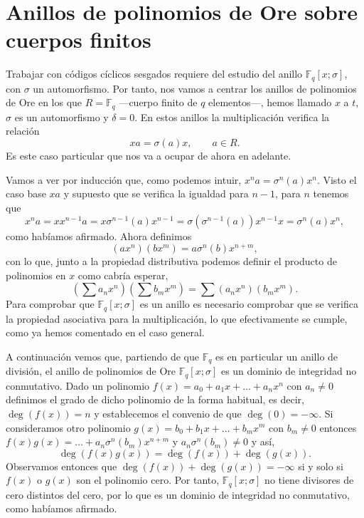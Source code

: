 \section{Anillos de polinomios de Ore sobre cuerpos finitos}

Trabajar con códigos cíclicos sesgados requiere del estudio del anillo \(\mathbb F_q[x; \sigma]\), con \(\sigma\) un automorfismo.
Por tanto, nos vamos a centrar los anillos de polinomios de Ore en los que \(R = \mathbb F_q\) —cuerpo finito de \(q\) elementos—, hemos llamado \(x\) a \(t\), \(\sigma\) es un automorfismo y \(\delta = 0\).
En estos anillos la multiplicación verifica la relación 
\[
  xa = \sigma(a)x, \qquad a \in R.
\]
Es este caso particular que nos va a ocupar de ahora en adelante.

Vamos a ver por inducción que, como podemos intuir, \(x^n a = \sigma^n(a)x^n\). 
Visto el caso base \(xa\) y supuesto que se verifica la igualdad para \(n - 1\), para \(n\) tenemos que
\[
  x^{n}a = xx^{n - 1}a = x\sigma^{n-1}(a)x^{n-1} = \sigma(\sigma^{n-1}(a))x^{n-1}x = \sigma^{n}(a)x^{n},
\]
como habíamos afirmado.
Ahora definimos
\[
  (ax^n)(bx^m) = a\sigma^n(b)x^{n+m},
\]
con lo que, junto a la propiedad distributiva podemos definir el producto de polinomios en \(x\) como cabría esperar,
\[
  \textstyle(\sum a_nx^n)(\sum b_mx^m) = \sum(a_nx^n)(b_mx^m).
\]
Para comprobar que \(\mathbb F_q[x; \sigma]\) es un anillo es necesario comprobar que se verifica la propiedad asociativa para la multiplicación, lo que efectivamente se cumple, como ya hemos comentado en el caso general.

A continuación vemos que, partiendo de que \(\mathbb F_q\) es en particular un anillo de división, el anillo de polinomios de Ore \(\mathbb F_q[x; \sigma]\) es un dominio de integridad no conmutativo.
Dado un polinomio \(f(x) = a_0 + a_1x + \dots + a_nx^n\) con \(a_n \neq 0\) definimos el grado de dicho polinomio de la forma habitual, es decir, \(\deg(f(x)) = n\) y establecemos el convenio de que \(\deg(0) = -\infty\).
Si consideramos otro polinomio \(g(x) = b_0 + b_1x + \dots + b_mx^m\) con \(b_m \neq 0\) entonces \(f(x)g(x) = \dots + a_n\sigma^n(b_m)x^{n+m}\) y \(a_n\sigma^n(b_m) \neq 0\) y así,
\[
  \deg(f(x)g(x)) = \deg(f(x)) + \deg(g(x)).
\]
Observamos entonces que \(\deg(f(x)) + \deg(g(x)) = -\infty\) si y solo si \(f(x)\) o \(g(x)\) son el polinomio cero.
Por tanto, \(\mathbb F_q[x; \sigma]\) no tiene divisores de cero distintos del cero, por lo que es un dominio de integridad no conmutativo, como habíamos afirmado.

